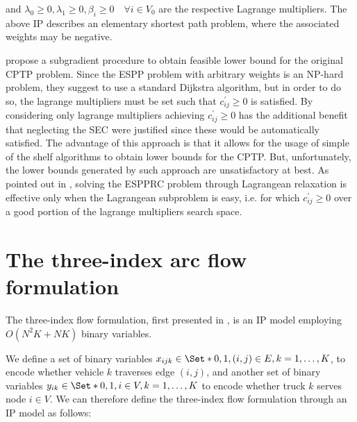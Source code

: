 and $\lambda_0 \ge 0, \lambda_1 \ge 0, \beta_i \ge 0 \quad \forall i \in V_0$ are the respective Lagrange multipliers.
The above IP describes an elementary shortest path problem, where the associated weights may be negative.

\cite{beasley1989} propose a subgradient procedure to obtain feasible lower bound for the original CPTP problem.
Since the ESPP problem with arbitrary weights is an NP-hard problem, they suggest to use a standard Dijkstra algorithm, but in order to do so, the lagrange multipliers must be set such that $c^\prime_{ij} \ge 0$ is satisfied.
By considering only lagrange multipliers achieving $c^\prime_{ij} \ge 0$ has the additional benefit that neglecting the SEC were justified since these would be automatically satisfied.
The advantage of this approach is that it allows for the usage of simple of the shelf algorithms to obtain lower bounds for the CPTP.
But, unfortunately, the lower bounds generated by such approach are unsatisfactory at best.
As pointed out in \cite{righini2004}, solving the ESPPRC problem through Lagrangean relaxation is effective only when the Lagrangean subproblem is easy, i.e. for which $c^\prime_{ij} \ge 0$ over a good portion of the lagrange multipliers search space.

\section{The three-index arc flow formulation}
\label{sec:intro-cvrp-three-index-flow-formulation}

The three-index flow formulation, first presented in \textcite{toth2002},
is an IP model employing $O(N^2 K + N K)$ binary variables.

We define a set of binary variables $x_{ijk} \in \Set*{0, 1}, (i, j) \in E, k = 1, \dots, K$, to encode whether vehicle $k$ traverses edge $(i, j)$,
and another set of binary variables $y_{ik} \in \Set*{0, 1}, i \in V, k = 1, \dots, K$ to encode whether truck $k$ serves node $i \in V$.
We can therefore define the three-index flow formulation through an IP model as follows:

